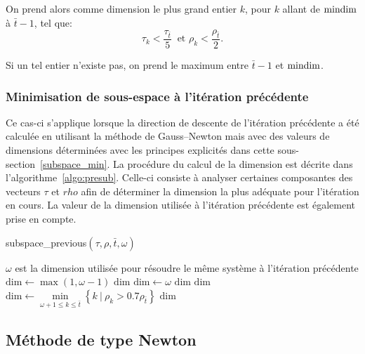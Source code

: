On prend alors comme dimension le plus grand entier $k$, pour $k$ allant de $\text{mindim}$ à $\bar{t}-1$, tel que:
\[
    \tau_k < \dfrac{\tau_{\bar{t}}}{5}\ \text{ et }  \rho_k < \dfrac{\rho_{\bar{t}}}{2}.
\] 

Si un tel entier n'existe pas, on prend le maximum entre $\bar{t}-1$ et $\text{mindim}$.

\subsubsection*{Minimisation de sous-espace à l'itération précédente}

Ce cas-ci s'applique lorsque la direction de descente de l'itération précédente a été calculée en utilisant la méthode de Gauss--Newton mais avec des valeurs de dimensions
déterminées avec les principes explicités dans cette sous-section~\ref{subspace_min}. La procédure du calcul de la dimension est décrite dans l'algorithme~\ref{algo:presub}.
Celle-ci consiste à analyser certaines composantes des vecteurs $\tau$ et $rho$ afin de déterminer la dimension la plus adéquate pour l'itération en cours. La valeur
de la dimension utilisée à l'itération précédente est également prise en compte.

\begin{algorithm}
    \caption{subspace\_previous$(\tau,\rho,\bar{t},\omega)$}\label{algo:presub}
    \begin{algorithmic}
        \STATE $\omega$ est la dimension utilisée pour résoudre le même système à l'itération précédente
        \STATE $\text{dim} \leftarrow \max(1,\omega-1)$
        \RETURN $\text{dim}$
        \ELSE 
        \STATE $\text{dim} \leftarrow \omega$
        \RETURN $\text{dim}$
        \ENDIF
        \RETURN $\text{dim}$
        \ELSE
        \STATE $\text{dim} \leftarrow \underset{\omega+1\leq k \leq \bar{t}}{\min}\left\{k \ | \ \rho_k > 0.7 \rho_{\bar{t}}\right\}$
        \RETURN $\text{dim}$
        \ENDIF 
    \end{algorithmic}
\end{algorithm}


\subsection{Méthode de type Newton}\label{newtonmethod}

